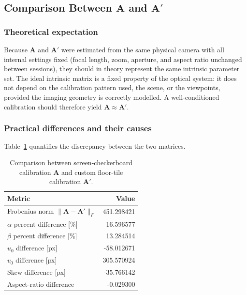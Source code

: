 \documentclass[11pt,a4paper]{article}
\begin{document}
\subsection{Comparison Between \texorpdfstring{$\mathbf{A}$}{A} and
            \texorpdfstring{$\mathbf{A}'$}{A'}}
\label{sec:comparison}

\subsubsection*{Theoretical expectation}

Because $\mathbf{A}$ and $\mathbf{A}'$ were estimated from the same physical
camera with all internal settings fixed (focal length, zoom, aperture, and
aspect ratio unchanged between sessions), they should in theory represent the
same intrinsic parameter set.  The ideal intrinsic matrix is a fixed property
of the optical system: it does not depend on the calibration pattern used, the
scene, or the viewpoints, provided the imaging geometry is correctly modelled.
A well-conditioned calibration should therefore yield $\mathbf{A} \approx \mathbf{A}'$.

\subsubsection*{Practical differences and their causes}

Table~\ref{tab:comparison} quantifies the discrepancy between the two matrices.

\begin{table}[htbp]
\centering
\caption{Comparison between screen-checkerboard calibration $\mathbf{A}$ and
         custom floor-tile calibration $\mathbf{A}'$.}
\label{tab:comparison}
\begin{tabular}{lr}
\hline
Metric & {Value} \\
\hline
Frobenius norm $\|\mathbf{A} - \mathbf{A}'\|_F$  & 451.298421 \\
$\alpha$ percent difference [\%]                   & 16.596577  \\
$\beta$ percent difference [\%]                    & 13.284514  \\
$u_0$ difference [px]                              & -58.012671 \\
$v_0$ difference [px]                              & 305.570924 \\
Skew difference [px]                               & -35.766142 \\
Aspect-ratio difference                            & -0.029300  \\
\hline
\end{tabular}
\end{table}
\end{document}
